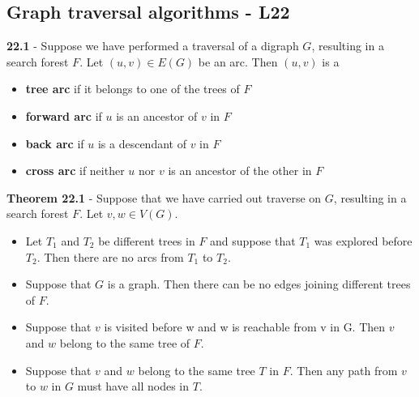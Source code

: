 \documentclass[a4paper]{article}
\begin{document}
\subsection*{Graph traversal algorithms - L22}
\textbf{22.1} - Suppose we have performed a traversal of a digraph $G$, resulting
in a search forest $F$. Let $(u, v) \in E(G)$ be an arc. Then $(u, v)$ is a
\begin{itemize}
    \item \textbf{tree arc} if it belongs to one of the trees of $F$
    \item \textbf{forward arc} if $u$ is an ancestor of $v$ in $F$
    \item \textbf{back arc} if $u$ is a descendant of $v$ in $F$
    \item \textbf{cross arc} if neither $u$ nor $v$ is an ancestor of the other in $F$
\end{itemize}
\textbf{Theorem 22.1} - Suppose that we have carried out traverse on $G$, resulting in a
search forest $F$. Let $v, w \in V(G)$.
\begin{itemize}
    \item Let $T_1$ and $T_2$ be different trees in $F$ and suppose that $T_1$ was explored before
    $T_2$. Then there are no arcs from $T_1$ to $T_2$.
    \item Suppose that $G$ is a graph. Then there can be no edges joining different trees
    of $F$.
    \item Suppose that $v$ is visited before w and w is reachable from v in G. Then $v$ and
    $w$ belong to the same tree of $F$.
    \item Suppose that $v$ and $w$ belong to the same tree $T$ in $F$. Then any path from $v$
    to $w$ in $G$ must have all nodes in $T$.
\end{itemize}
\end{document}
